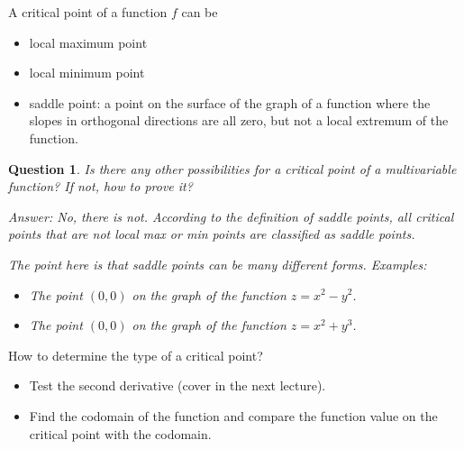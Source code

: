 \documentclass{article}
\newtheorem*{question}{Question}
\begin{document}
A critical point of a function $f$ can be 
\begin{itemize}
  \item local maximum point
  \item local minimum point
  \item saddle point: a point on the surface of the graph of a function where 
    the slopes in orthogonal directions are all zero, but not a local extremum 
    of the function.
\end{itemize}

\begin{question}
  Is there any other possibilities for a critical point of a multivariable 
  function? If not, how to prove it?

  Answer: No, there is not. According to the definition of saddle points, all 
  critical points that are not local max or min points are classified as saddle 
  points.

  The point here is that saddle points can be many different forms. Examples:
  \begin{itemize}
    \item The point $(0, 0)$ on the graph of the function $z = x^2 - y^2$.
    \item The point $(0, 0)$ on the graph of the function $z = x^2 + y^3$.
  \end{itemize}
\end{question}

How to determine the type of a critical point?
\begin{itemize}
  \item Test the second derivative (cover in the next lecture).
  \item Find the codomain of the function and compare the function value on the 
  critical point with the codomain.
\end{itemize}
\end{document}
